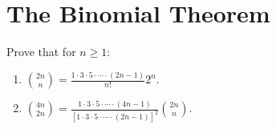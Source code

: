 \section{The Binomial Theorem}

\begin{exercise}
    Prove that for $n \geq 1$:
    \begin{enumerate}
        \item $\displaystyle \binom{2n}{n} = \frac{1\cdot 3 \cdot 5 \cdot \cdots \cdot (2n-1)}{n!}2^n .$
        \item $\displaystyle \binom{4n}{2n} = \frac{1\cdot 3 \cdot 5 \cdot \cdots \cdot (4n-1)}{[1\cdot 3 \cdot 5 \cdot \cdots \cdot (2n-1)]^2}\binom{2n}{n}.$
    \end{enumerate}
\end{exercise}

